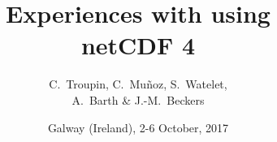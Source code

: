 


\title{Experiences with using\\ netCDF 4}
\author[C.~Troupin]{C.~Troupin, C.~Muñoz, S.~Watelet,\\ A.~Barth \& J.-M.~Beckers}
\date{Galway (Ireland), 2-6 October, 2017}
  





